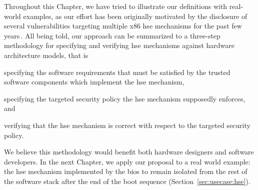 
Throughout this Chapter, we have tried to illustrate our definitions with
real-world examples, as our effort has been originally motivated by the
disclosure of several vulnerabilities targeting multiple x86 \ac{hse} mechanisms
for the past few
years\,\cite{wojtczuk2009smram,duflot2009smram,rutkowska2008remap,domas2015sinkhole,kallenberg2015racecondition}.
%
All being told, our approach can be summarized to a three-step methodology for
specifying and verifying \ac{hse} mechanisms against hardware architecture
models, that is
%
\begin{inparaenum}[(1)]
\item specifying the software requirements that must be satisfied by the trusted
  software components which implement the \ac{hse} mechanism,
%
\item specifying the targeted security policy the \ac{hse} mechanism supposedly
  enforces, and
%
\item verifying that the \ac{hse} mechanism is correct with respect to the
  targeted security policy.
\end{inparaenum}
%
We believe this methodology would benefit both hardware designers and software
developers.
%
In the next Chapter, we apply our proposal to a real world example: the \ac{hse}
mechanism implemented by the \ac{bios} to remain isolated from the rest of the
software stack after the end of the boot sequence
(Section~\ref{sec:usecase:hse}).
